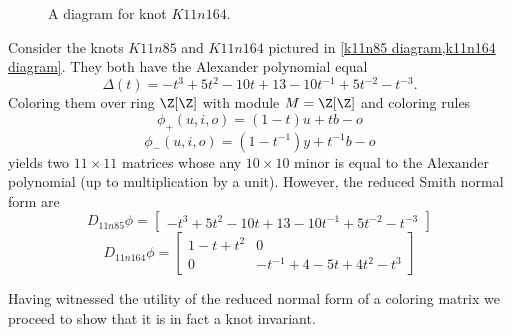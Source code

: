 \begin{example}
\begin{figure}[h]
    \caption{A diagram for knot $K11n164$.\label{k11n164 diagram}}
  \end{figure}
  Consider the knots $K11n85$ and $K11n164$ pictured in \cref{k11n85 diagram,k11n164 diagram}. They both have the Alexander polynomial equal 
  $$
  \Delta(t)=-t^3+5t^2-10t+13-10t^{-1}+5t^{-2}-t^{-3}.
  $$
  Coloring them over ring $\Z[\Z]$ with module $M=\Z[\Z]$ and coloring rules
  $$
  \phi_+(u, i, o)=(1-t)u+tb-o
  $$
  $$
  \phi_-(u,i,o)=(1-t^{-1})y+t^{-1}b-o
  $$
  yields two $11\times 11$ matrices whose any $10\times 10$ minor is equal to the Alexander polynomial (up to multiplication by a unit). However, the reduced Smith normal form are 
  $$D_{11n85}\phi=\begin{bmatrix}
    -t^3+5t^2-10t+13-10t^{-1}+5t^{-2}-t^{-3}
  \end{bmatrix}$$
  $$
  D_{11n164}\phi=\begin{bmatrix}
    1-t+t^2 & 0 \\ 
    0 & -t^{-1}+4-5t+4t^2-t^3
  \end{bmatrix}
  $$
\end{example}

Having witnessed the utility of the reduced normal form of a coloring matrix we proceed to show that it is in fact a knot invariant.


